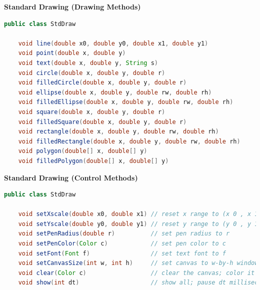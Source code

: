 \documentclass[8pt,a4paper,compress]{beamer}
\begin{document}
\begin{frame}[fragile]
\pause

\textbf{Standard Drawing (Drawing Methods)}

\begin{lstlisting}[language=Java]
public class StdDraw

    void line(double x0, double y0, double x1, double y1)
    void point(double x, double y)
    void text(double x, double y, String s)
    void circle(double x, double y, double r)
    void filledCircle(double x, double y, double r)
    void ellipse(double x, double y, double rw, double rh)
    void filledEllipse(double x, double y, double rw, double rh)
    void square(double x, double y, double r)
    void filledSquare(double x, double y, double r)
    void rectangle(double x, double y, double rw, double rh)
    void filledRectangle(double x, double y, double rw, double rh)
    void polygon(double[] x, double[] y)
    void filledPolygon(double[] x, double[] y)
\end{lstlisting}

\textbf{Standard Drawing (Control Methods)}

\begin{lstlisting}[language=Java]
public class StdDraw

    void setXscale(double x0, double x1) // reset x range to (x 0 , x 1 )
    void setYscale(double y0, double y1) // reset y range to (y 0 , y 1 )
    void setPenRadius(double r)          // set pen radius to r
    void setPenColor(Color c)            // set pen color to c
    void setFont(Font f)                 // set text font to f
    void setCanvasSize(int w, int h)     // set canvas to w-by-h window
    void clear(Color c)                  // clear the canvas; color it c
    void show(int dt)                    // show all; pause dt milliseconds
\end{lstlisting}
\end{frame}
\end{document}
